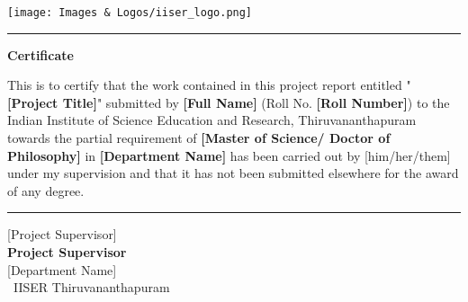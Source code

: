 
\thispagestyle{plain}


 \flushleft
 \texttt{[image: Images \& Logos/iiser\_logo.png]}

\vspace{0.5\baselineskip}
\hrule
\vspace{3\baselineskip}

\begin{center}
{\Large {\bf Certificate}}
\end{center}

\vspace{\baselineskip}

\noindent This is to certify that the work contained in this project report entitled
"\textbf{[Project Title]}" submitted by \textbf{[Full Name]} (Roll No. \textbf{[Roll Number]}) to the Indian Institute of Science Education and Research, Thiruvananthapuram towards the partial requirement of {\bf [Master of Science/ Doctor of Philosophy]} in \textbf{[Department Name]} has been carried out by {[him/her/them]} under my supervision and that it has not been submitted elsewhere for the award of any degree.

\vspace{3\baselineskip}
\begin{flushright}
\begin{minipage}[c]{0.45\textwidth}
\centering
\vspace{3\baselineskip}
\hrule
\vspace{1.5\baselineskip}
{\large [Project Supervisor]} \bigskip\\
{\large \bf Project Supervisor} \\
\large [Department Name] ~\\\
IISER Thiruvananthapuram
\end{minipage}
\end{flushright}
\vspace{\baselineskip}
\restoregeometry

